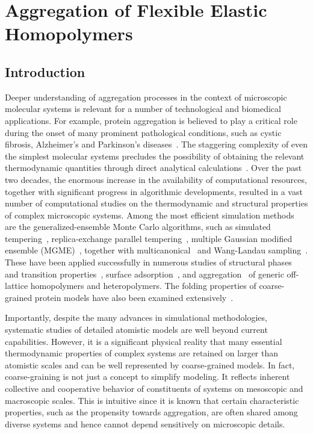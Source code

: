 \documentclass[12pt]{report}
\begin{document}
\chapter{Aggregation of Flexible Elastic Homopolymers}
\label{chap:Aggregation}
\section{Introduction}
%
Deeper understanding of aggregation processes in the context
of microscopic molecular systems is relevant for a number of 
technological and biomedical applications. For example,
protein aggregation is believed to play a critical role during
the onset of many prominent pathological conditions, 
such as cystic fibrosis, Alzheimer's and Parkinson's
diseases~\cite{Selkoe,Chiti}. The staggering complexity of even the 
simplest molecular systems precludes the possibility of obtaining 
the relevant thermodynamic quantities through direct analytical 
calculations~\cite{Bachmann2014}. Over the past two decades, 
the enormous increase in the availability of computational resources, 
together with significant progress in algorithmic developments, 
resulted in a vast number of computational studies on the thermodynamic 
and structural properties of complex microscopic systems. 
Among the most efficient simulation methods are the
generalized-ensemble Monte Carlo algorithms, such as
simulated tempering~\cite{marinari,lyubartsev},
replica-exchange parallel tempering~\cite{sw1,geyer1,huku1,huku2}, 
multiple Gaussian modified ensemble (MGME)~\cite{Neuhaus2006}, 
together with
multicanonical~\cite{muca1a,muca1b,muca2,muca3,muca4,Bachmann2013}
and Wang-Landau sampling~\cite{wl1,wl2,wl3}. 
These have been applied successfully in numerous studies of 
structural phases and transition
properties~\cite{Schnabel2009,bf1,bf2,grass2,vbj1,strauch1,svbj1,%
taylorRange1, taylorRange2,seaton3,semisslb1,Koci2015}, surface
adsorption~\cite{bj4,prellberg1,paul1,mbj1,liang1,allen1,vb1,ywli1,%
mjb4,vgb1}, and
aggregation~\cite{jbj1,Junghans2008,Junghans2009,Junghans2011,%
Zieren2014,Zieren2015} of generic off-lattice homopolymers and
heteropolymers. The folding properties of coarse-grained protein models
have also been examined
extensively~\cite{dill1,still1,still2,som1,hsu1,bj1,ssbj1}.
 
Importantly, despite the many advances in simulational
methodologies, systematic studies of detailed atomistic
models are well beyond current capabilities. 
However, it is a significant physical reality that many 
essential thermodynamic properties of complex systems are 
retained on larger than atomistic scales and can be well represented 
by coarse-grained models. In fact, coarse-graining is not just a concept
to simplify modeling. It reflects inherent collective and cooperative
behavior of constituents of systems on mesoscopic and macroscopic scales. 
This is intuitive since it is known that certain characteristic
properties, such as the propensity towards aggregation, are often shared
among diverse systems and hence cannot depend sensitively on microscopic
details.
 
\end{document}
